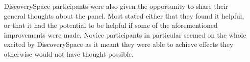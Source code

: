 Discovery\-Space participants were also given the opportunity to share their general thoughts about the panel. Most stated either that they found it helpful, or that it had the potential to be helpful if some of the aforementioned improvements were made. Novice participants in particular seemed on the whole excited by Discovery\-Space as it meant they were able to achieve effects they otherwise would not have thought possible.
